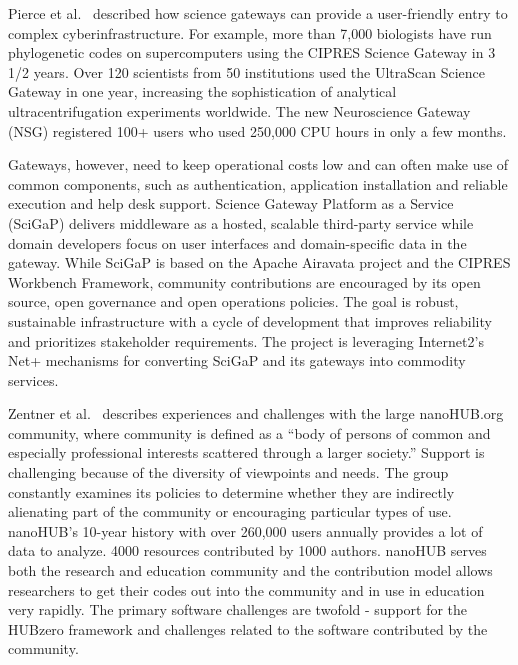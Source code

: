 \documentclass[11pt, oneside]{amsart}
\newcommand{\toolname}[1] {\textsf{#1}}
\begin{document}
Pierce et al.~\cite{Pierce2_WSSSPE} described how science gateways can provide a user-friendly
entry to complex cyberinfrastructure. For example, more than 7,000
biologists have run phylogenetic codes on supercomputers using the \toolname{CIPRES}
Science Gateway in 3 1/2 years. Over 120 scientists from 50 institutions used the
\toolname{UltraScan Science Gateway} in one year, increasing the sophistication of analytical
ultracentrifugation experiments worldwide. The new Neuroscience Gateway (\toolname{NSG})
registered 100+ users who used 250,000 CPU hours in only a few months.

Gateways, however, need to keep operational costs low and can often make use of
common components, such as authentication, application installation and
reliable execution and help desk support. Science Gateway Platform as a Service (\toolname{SciGaP}) delivers
middleware as a hosted, scalable third-party service while domain developers
focus on user interfaces and domain-specific data in the gateway. 
While \toolname{SciGaP} is based on the \toolname{Apache Airavata} project
and the \toolname{CIPRES} Workbench Framework, community contributions are encouraged
by its open source, open governance and open operations policies. The
goal is robust, sustainable infrastructure with a cycle of development that
improves reliability and prioritizes stakeholder requirements. The project is
leveraging Internet2's \toolname{Net+} mechanisms for converting \toolname{SciGaP} and its gateways
into commodity services.

Zentner et al.~\cite{Zentner_WSSSPE} describes experiences and challenges with the large
\toolname{nanoHUB.org} community, where community is defined as a ``body of persons of
common and especially professional interests scattered through a larger
society.'' Support is challenging because of the diversity of
viewpoints and needs. The group constantly examines its policies to determine
whether they are indirectly alienating part of the community or encouraging
particular types of use.
%
\toolname{nanoHUB}'s 10-year history with over 260,000 users annually provides a lot of
data to analyze. 4000 resources contributed by 1000 authors. \toolname{nanoHUB} serves
both the research and education community and the contribution model allows
researchers to get their codes out into the community and in use in education
very rapidly. The primary software challenges are twofold - support for the
\toolname{HUBzero} framework and challenges related to the software contributed by the
community.
\end{document}
